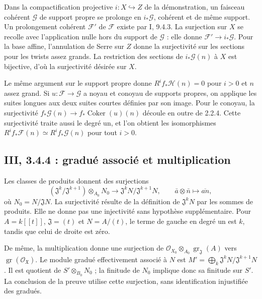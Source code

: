 \documentclass[11pt,a4paper]{article}
\begin{document}
Dans la compactification projective $i:X\hookrightarrow Z$
de la démonstration, un faisceau cohérent $\mathcal G$ de
support propre se prolonge en $i_*\mathcal G$, cohérent et
de même support. Un prolongement cohérent $\mathcal F'$ de
$\mathcal F$ existe par I, 9.4.3. La surjection sur $X$
se recolle avec l'application nulle hors du support de
$\mathcal G$ : elle donne $\mathcal F'\to i_*\mathcal G$.
Pour la base affine, l'annulation de Serre sur $Z$ donne
la surjectivité sur les sections pour les twists assez grands.
La restriction des sections de $i_*\mathcal G(n)$ à $X$
est bijective, d'où la surjectivité désirée sur $X$.

Le même argument sur le support propre donne
$R^if_*\mathcal H(n)=0$ pour $i>0$ et $n$ assez grand.
Si $u:\mathcal F\to\mathcal G$ a noyau et conoyau de supports
propres, on applique les suites longues aux deux suites courtes
définies par son image. Pour le conoyau, la surjectivité
$f_*\mathcal G(n)\to f_*\operatorname{Coker}(u)(n)$ découle
en outre de 2.2.4. Cette surjectivité traite aussi le degré un,
et l'on obtient les isomorphismes
$R^if_*\mathcal F(n)\simeq R^if_*\mathcal G(n)$ pour tout $i>0$.

\subsection{III, 3.4.4 : gradué associé et multiplication}
\label{note:base3-associatedgraded}
Les classes de produits donnent des surjections
\[
 (\mathfrak J^k/\mathfrak J^{k+1})\otimes_{A_0}N_0
 \longrightarrow \mathfrak J^kN/\mathfrak J^{k+1}N,
 \qquad \bar a\otimes\bar n\longmapsto\overline{an},
\]
où $N_0=N/\mathfrak JN$. La surjectivité résulte de la définition
de $\mathfrak J^kN$ par les sommes de produits.
Elle ne donne pas une injectivité sans hypothèse supplémentaire.
Pour $A=k[[t]]$, $\mathfrak J=(t)$ et $N=A/(t)$, le terme
de gauche en degré un est $k$, tandis que celui de droite est zéro.

De même, la multiplication donne une surjection de
$\mathcal O_{X_0}\otimes_{A_0}\operatorname{gr}_{\mathfrak J}(A)$
vers $\operatorname{gr}(\mathcal O_{\mathfrak X})$.
Le module gradué effectivement associé à $N$ est
$M'=\bigoplus_k\mathfrak J^kN/\mathfrak J^{k+1}N$.
Il est quotient de $S'\otimes_{B_0}N_0$ ; la finitude de $N_0$
implique donc sa finitude sur $S'$. La conclusion de la preuve
utilise cette surjection, sans identification injustifiée des gradués.
\end{document}
